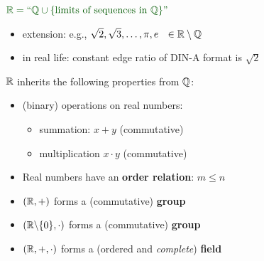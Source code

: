 {\begin{frame}
\vspace{0.5cm}
$\color{defgruen} \R = \text{``}\Q \cup \{\text{limits of sequences in } \Q\} \text{''}$
\vspace{0.5cm}
\begin{itemize}
\item extension: e.g., $\sqrt{2}, \sqrt{3},\ldots, \pi, e ~~\in{\mathbb{R}}\setminus{\mathbb{Q}}$
\item in real life: constant edge ratio of DIN-A format is $\sqrt{2}$
\end{itemize}
\vspace{0.5cm}
${\mathbb{R}}$ inherits the following properties from ${\mathbb{Q}}$: \\\vspace{0.2cm}
\begin{itemize}
\item (binary) operations on real numbers:
\begin{itemize} \normalsize
	\item summation: $x+y$ (commutative)
	\item multiplication $x \cdot y$ (commutative)
\end{itemize}
\item Real numbers have an \textbf{order relation}: $m\le n$ \vspace{0.2cm}
\item $({\mathbb{R}}, +)$ forms a (commutative) \textbf{group} \vspace{0.2cm}
\item $({\mathbb{R}} \backslash \{0\}, \cdot)$ forms a (commutative) \textbf{group} \vspace{0.2cm}
\item $({\mathbb{R}},+, \cdot)$ forms a (ordered and \textit{complete}) \textbf{field} \vspace{0.2cm}

\end{itemize}
\end{frame}
	
	
	
	
	
}
